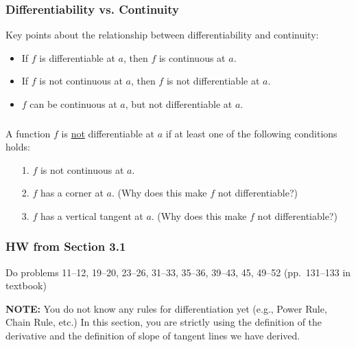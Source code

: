 \documentclass[14pt]{beamer}
\begin{document}
\begin{frame}
\frametitle{Differentiability vs. Continuity}
\small
Key points about the relationship between differentiability and continuity:

\begin{itemize}
\item If $f$ is differentiable at $a$, then $f$ is continuous at $a$.
\item If $f$ is not continuous at $a$, then $f$ is not differentiable at $a$.
\item $f$ can be continuous at $a$, but not differentiable at $a$.
\end{itemize}
\end{frame}

\begin{frame}
\frametitle{}
\small
A function $f$ is \underline{not} differentiable at $a$ if at least one of the following conditions holds:
\begin{itemize}
\item[1.] $f$ is not continuous at $a$.
\item[2.] $f$ has a corner at $a$.  (Why does this make $f$ not differentiable?)
\item[3.] $f$ has a vertical tangent at $a$.  (Why does this make $f$ not differentiable?)
\end{itemize}
\end{frame}

\begin{frame}
\frametitle{HW from Section 3.1}  
Do problems 11--12, 19--20, 23--26, 31--33, 35--36, 39--43, 45, 49--52 (pp.\ 131--133 in textbook)

\bigskip
{\bf NOTE:}  You do not know any rules for differentiation yet (e.g., Power Rule, Chain Rule, etc.)  In this section, you are strictly using the definition of the derivative and the definition of slope of tangent lines we have derived.
\end{frame}

\end{document}
